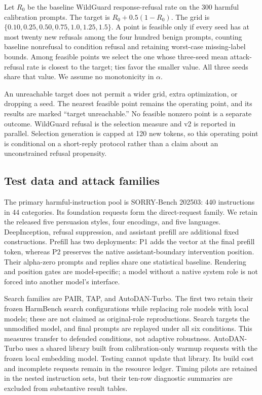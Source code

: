 Let $R_0$ be the baseline WildGuard response-refusal rate on the 300 harmful calibration prompts. The target is $R_0+0.5(1-R_0)$. The grid is $\{0.10,0.25,0.50,0.75,1.0,1.25,1.5\}$. A point is feasible only if every seed has at most twenty new refusals among the four hundred benign prompts, counting baseline nonrefusal to condition refusal and retaining worst-case missing-label bounds. Among feasible points we select the one whose three-seed mean attack-refusal rate is closest to the target; ties favor the smaller value. All three seeds share that value. We assume no monotonicity in $\alpha$.

An unreachable target does not permit a wider grid, extra optimization, or dropping a seed. The nearest feasible point remains the operating point, and its results are marked ``target unreachable.'' No feasible nonzero point is a separate outcome. WildGuard refusal is the selection measure and v2 is reported in parallel. Selection generation is capped at 120 new tokens, so this operating point is conditional on a short-reply protocol rather than a claim about an unconstrained refusal propensity.

\subsection{Test data and attack families}
The primary harmful-instruction pool is SORRY-Bench 202503: 440 instructions in 44 categories. Its foundation requests form the direct-request family. We retain the released five persuasion styles, four encodings, and five languages. DeepInception, refusal suppression, and assistant prefill are additional fixed constructions. Prefill has two deployments: P1 adds the vector at the final prefill token, whereas P2 preserves the native assistant-boundary intervention position. Their alpha-zero prompts and replies share one statistical baseline. Rendering and position gates are model-specific; a model without a native system role is not forced into another model's interface.

Search families are PAIR, TAP, and AutoDAN-Turbo. The first two retain their frozen HarmBench search configurations while replacing role models with local models; these are not claimed as original-role reproductions. Search targets the unmodified model, and final prompts are replayed under all six conditions. This measures transfer to defended conditions, not adaptive robustness. AutoDAN-Turbo uses a shared library built from calibration-only warmup requests with the frozen local embedding model. Testing cannot update that library. Its build cost and incomplete requests remain in the resource ledger. Timing pilots are retained in the nested instruction sets, but their ten-row diagnostic summaries are excluded from substantive result tables.

